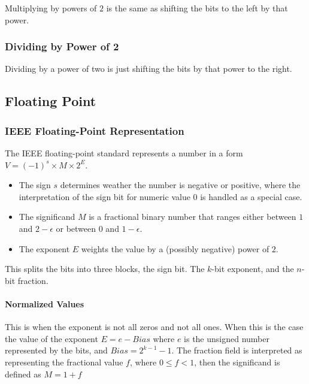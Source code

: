 \documentclass[10pt]{armath}
\begin{document}
Multiplying by powers of $2$ is the same as shifting the bits to the left by
that power.

\subsubsection{Dividing by Power of 2}%
\label{ssub:dividing_by_power_of_2}

Dividing by a power of two is just shifting the bits by that power to the
right.

\subsection{Floating Point}%
\label{sub:floating_point}

\subsubsection{IEEE Floating-Point Representation}%
\label{ssub:ieee_floating_point_representation}

The IEEE floating-point standard represents a number in a form $V=(-1)^s\times
M\times 2^E$.
\begin{itemize}
  \item The sign $s$ determines weather the number is negative or positive,
    where the interpretation of the sign bit for numeric value $0$ is handled
    as a special case.
  \item The significand $M$ is a fractional binary number that ranges either
    between $1$ and $2-\epsilon$ or between $0$ and $1-\epsilon$.
  \item The exponent $E$ weights the value by a (possibly negative) power of
    $2$.
\end{itemize}

This splits the bits into three blocks, the sign bit. The $k$-bit exponent, and
the $n$-bit fraction.

\paragraph{Normalized Values}%
\label{par:normalized_values}

This is when the exponent is not all zeros and not all ones. When this is the
case the value of the exponent $E=e-Bias$ where $e$ is the unsigned number
represented by the bits, and $Bias=2^{k-1}-1$. The fraction field is
interpreted as representing the fractional value $f$, where $0\leq f<1$, then
the significand is defined as $M=1+f$
\end{document}
